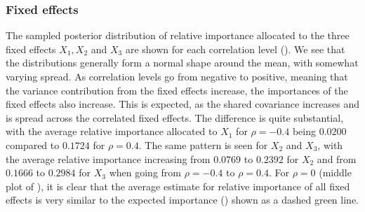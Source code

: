 \subsubsection{Fixed effects}
The sampled posterior distribution of relative importance allocated to the three fixed effects $X_1, X_2$ and $X_3$ are shown for each correlation level (). We see that the distributions generally form a normal shape around the mean, with somewhat varying spread. As correlation levels go from negative to positive, meaning that the variance contribution from the fixed effects increase, the importances of the fixed effects also increase. This is expected, as the shared covariance increases and is spread across the correlated fixed effects. The difference is quite substantial, with the average relative importance allocated to $X_1$ for $\rho=-0.4$ being $0.0200$ compared to $0.1724$ for $\rho=0.4$. The same pattern is seen for $X_2$ and $X_3$, with the average relative importance increasing from $0.0769$ to $0.2392$ for $X_2$ and from $0.1666$ to $0.2984$ for $X_3$ when going from $\rho=-0.4$ to $\rho=0.4$. For $\rho=0$ (middle plot of ), it is clear that the average estimate for relative importance of all fixed effects is very similar to the expected importance () shown as a dashed green line. 
\\
\\
